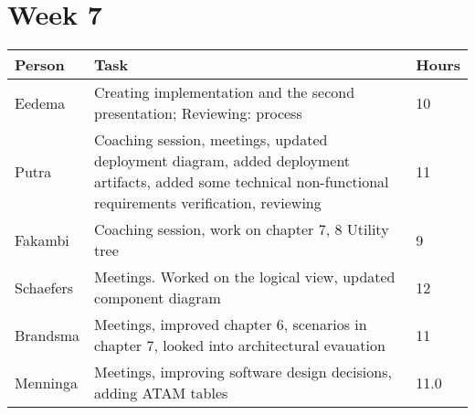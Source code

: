 \section{Week 7}
\begin{tabular}{p{} p{} p{}}
	\textbf{Person} & \textbf{Task}                                                                                                                  & \textbf{Hours} \\ \midrule
	Eedema          & Creating implementation and the second presentation; Reviewing: process& 10 \\ \midrule
	Putra           & Coaching session, meetings, updated deployment diagram, added deployment artifacts, added some technical non-functional requirements verification, reviewing & 11 \\ \midrule
	Fakambi         & Coaching session, work on chapter 7, 8 Utility tree & 9\\ \midrule
	Schaefers       & Meetings. Worked on the logical view, updated component diagram & 12 \\ \midrule
	Brandsma        & Meetings, improved chapter 6, scenarios in chapter 7, looked into architectural evauation & 11 \\ \midrule
	Menninga        & Meetings, improving software design decisions, adding ATAM tables                      &  11.0    \\
	\midrule
\end{tabular}
